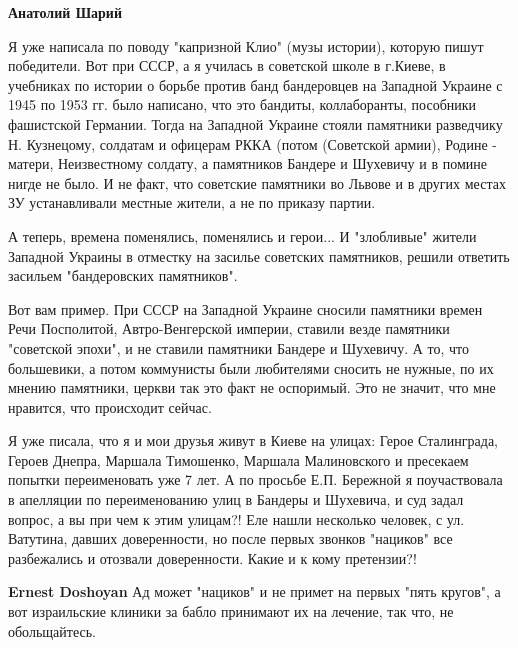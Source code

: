 \begin{itemize}
\begin{itemize}
 
\textbf{Анатолий Шарий} 

Я уже написала по поводу "капризной Клио" (музы истории), которую пишут
победители. Вот при СССР, а я училась в советской школе в г.Киеве, в учебниках
по истории о борьбе против банд бандеровцев на Западной Украине с 1945 по 1953
гг. было написано, что это бандиты, коллаборанты, пособники фашистской
Германии. Тогда на Западной Украине стояли памятники разведчику Н. Кузнецому,
солдатам и офицерам РККА (потом (Советской армии), Родине - матери,
Неизвестному солдату, а памятников Бандере и Шухевичу и в помине нигде не было.
И не факт, что советские памятники во Львове и в других местах ЗУ устанавливали
местные жители, а не по приказу партии. 

А теперь, времена поменялись, поменялись и герои... И "злобливые" жители
Западной Украины в отместку на засилье советских памятников, решили ответить
засильем "бандеровских памятников". 

Вот вам пример. При СССР на Западной Украине сносили памятники времен Речи
Посполитой, Автро-Венгерской империи, ставили везде памятники "советской
эпохи", и не ставили памятники Бандере и Шухевичу. А то, что большевики, а
потом коммунисты были любителями сносить не нужные, по их мнению памятники,
церкви так это факт не оспоримый. Это не значит, что мне нравится, что
происходит сейчас. 

Я уже писала, что я и мои друзья живут в Киеве на улицах: Герое Сталинграда,
Героев Днепра, Маршала Тимошенко, Маршала Малиновского и пресекаем попытки
переименовать уже 7 лет. А по просьбе Е.П.  Бережной я поучаствовала в
апелляции по переименованию улиц в Бандеры и Шухевича, и суд задал вопрос, а вы
при чем к этим улицам?! Еле нашли несколько человек, с ул. Ватутина, давших
доверенности, но после первых звонков "нациков" все разбежались и отозвали
доверенности. Какие и к кому претензии?!


 
\textbf{Ernest Doshoyan} Ад может "нациков" и не примет на первых "пять
кругов", а вот израильские клиники за бабло принимают их на лечение, так что,
не обольщайтесь.


\end{itemize}
\end{itemize}
